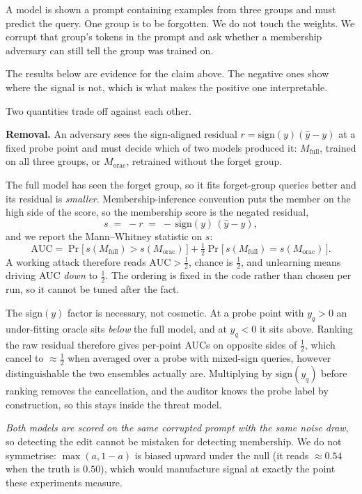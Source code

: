\documentclass[11pt,a4paper]{article}
\newcommand{\Mfull}{M_{\mathrm{full}}}
\newcommand{\Morac}{M_{\mathrm{orac}}}
\begin{document}
A model is shown a prompt containing examples from three groups and must
predict the query. One group is to be forgotten. We do not touch the weights.
We corrupt that group's tokens in the prompt and ask whether a membership
adversary can still tell the group was trained on.

The results below are evidence for the claim above. The negative ones show
where the signal is not, which is what makes the positive one interpretable.

Two quantities trade off against each other.

\textbf{Removal.} An adversary sees the sign-aligned residual
$r=\mathrm{sign}(y)(\hat y - y)$ at a fixed probe point and must decide which
of two models produced it: $\Mfull$, trained on all three groups, or $\Morac$,
retrained without the forget group.

The full model has seen the forget group, so it fits forget-group queries
better and its residual is \emph{smaller}. Membership-inference convention puts
the member on the high side of the score, so the membership score is the
negated residual,
\begin{equation}
s \;=\; -r \;=\; -\,\mathrm{sign}(y)\,(\hat y - y),
\end{equation}
and we report the Mann--Whitney statistic on $s$:
\begin{equation}
\mathrm{AUC}
= \Pr\big[\,s(\Mfull) > s(\Morac)\,\big]
+ \tfrac12\Pr\big[\,s(\Mfull)=s(\Morac)\,\big].
\end{equation}
A working attack therefore reads $\mathrm{AUC}>\tfrac12$, chance is
$\tfrac12$, and unlearning means driving AUC \emph{down} to $\tfrac12$. The
ordering is fixed in the code rather than chosen per run, so it cannot be tuned
after the fact.

The $\mathrm{sign}(y)$ factor is necessary, not cosmetic. At a probe point
with $y_q>0$ an under-fitting oracle sits \emph{below} the full model, and at
$y_q<0$ it sits above. Ranking the raw residual therefore gives per-point AUCs
on opposite sides of $\tfrac12$, which cancel to $\approx\tfrac12$ when
averaged over a probe with mixed-sign queries, however distinguishable the two
ensembles actually are. Multiplying by $\mathrm{sign}(y_q)$ before ranking
removes the cancellation, and the auditor knows the probe label by
construction, so this stays inside the threat model.

\emph{Both models are scored on the same corrupted prompt with the same noise
draw}, so detecting the edit cannot be mistaken for detecting membership. We do
not symmetrise: $\max(a,1-a)$ is biased upward under the null (it reads
$\approx0.54$ when the truth is $0.50$), which would manufacture signal at
exactly the point these experiments measure.
\end{document}
